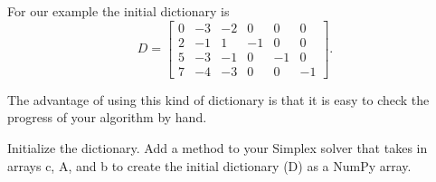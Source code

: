 For our example the initial dictionary is
\begin{equation*}
D = \begin{bmatrix}
    0 & -3 & -2 & 0 & 0 & 0\\
    2 & -1 & 1 & -1 & 0 & 0\\
    5 & -3 & -1 & 0 & -1 & 0\\
    7 & -4 & -3 & 0 & 0 & -1
    \end{bmatrix}.
\end{equation*}

The advantage of using this kind of dictionary is that it is easy to check the progress of your algorithm by hand.

\begin{problem}{Initialize the dictionary.}
Add a method to your Simplex solver that takes in arrays c, A, and b to create the initial dictionary (D) as a NumPy array.
\label{prob:makedictionary}
\end{problem}


